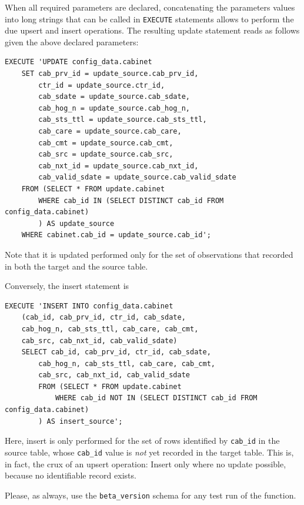 When all required parameters are declared, concatenating the parameters values into long strings that can be called in \texttt{EXECUTE} statements allows to perform the due upsert and insert operations.
The resulting update statement reads as follows given the above declared parameters:
\begin{lstlisting}[language=postgreSQL]
EXECUTE 'UPDATE config_data.cabinet 
	SET cab_prv_id = update_source.cab_prv_id, 
		ctr_id = update_source.ctr_id, 
		cab_sdate = update_source.cab_sdate, 
		cab_hog_n = update_source.cab_hog_n, 
		cab_sts_ttl = update_source.cab_sts_ttl, 
		cab_care = update_source.cab_care, 
		cab_cmt = update_source.cab_cmt, 
		cab_src = update_source.cab_src, 
		cab_nxt_id = update_source.cab_nxt_id, 
		cab_valid_sdate = update_source.cab_valid_sdate
	FROM (SELECT * FROM update.cabinet 
		WHERE cab_id IN (SELECT DISTINCT cab_id FROM config_data.cabinet) 
		) AS update_source 
	WHERE cabinet.cab_id = update_source.cab_id';
\end{lstlisting}
Note that it is updated performed only for the set of observations that recorded in both the target and the source table. 

Conversely, the insert statement is
\begin{lstlisting}[language=postgreSQL]
EXECUTE 'INSERT INTO config_data.cabinet 
	(cab_id, cab_prv_id, ctr_id, cab_sdate, 
	cab_hog_n, cab_sts_ttl, cab_care, cab_cmt, 
	cab_src, cab_nxt_id, cab_valid_sdate) 
	SELECT cab_id, cab_prv_id, ctr_id, cab_sdate, 
	    cab_hog_n, cab_sts_ttl, cab_care, cab_cmt, 
	    cab_src, cab_nxt_id, cab_valid_sdate
		FROM (SELECT * FROM update.cabinet
			WHERE cab_id NOT IN (SELECT DISTINCT cab_id FROM config_data.cabinet)
		) AS insert_source';
\end{lstlisting}
Here, insert is only performed for the set of rows identified by \texttt{cab\_id} in the source table, whose  \texttt{cab\_id} value is {\em not} yet recorded in the target table. This is, in fact, the crux of an upsert operation: Insert only where no update possible, because no identifiable record exists. 


Please, as always, use the \texttt{beta\_version} schema for any test run of the function.






